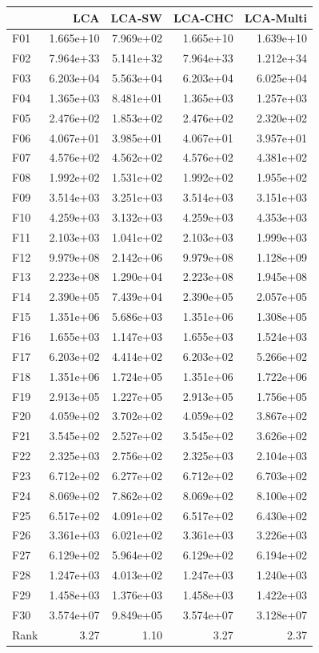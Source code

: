 \begin{tabular}{lrrrr}
\toprule
 & LCA & LCA-SW & LCA-CHC & LCA-Multi \\
\midrule
F01 & 1.665e+10 & 7.969e+02 & 1.665e+10 & 1.639e+10 \\
F02 & 7.964e+33 & 5.141e+32 & 7.964e+33 & 1.212e+34 \\
F03 & 6.203e+04 & 5.563e+04 & 6.203e+04 & 6.025e+04 \\
F04 & 1.365e+03 & 8.481e+01 & 1.365e+03 & 1.257e+03 \\
F05 & 2.476e+02 & 1.853e+02 & 2.476e+02 & 2.320e+02 \\
F06 & 4.067e+01 & 3.985e+01 & 4.067e+01 & 3.957e+01 \\
F07 & 4.576e+02 & 4.562e+02 & 4.576e+02 & 4.381e+02 \\
F08 & 1.992e+02 & 1.531e+02 & 1.992e+02 & 1.955e+02 \\
F09 & 3.514e+03 & 3.251e+03 & 3.514e+03 & 3.151e+03 \\
F10 & 4.259e+03 & 3.132e+03 & 4.259e+03 & 4.353e+03 \\
F11 & 2.103e+03 & 1.041e+02 & 2.103e+03 & 1.999e+03 \\
F12 & 9.979e+08 & 2.142e+06 & 9.979e+08 & 1.128e+09 \\
F13 & 2.223e+08 & 1.290e+04 & 2.223e+08 & 1.945e+08 \\
F14 & 2.390e+05 & 7.439e+04 & 2.390e+05 & 2.057e+05 \\
F15 & 1.351e+06 & 5.686e+03 & 1.351e+06 & 1.308e+05 \\
F16 & 1.655e+03 & 1.147e+03 & 1.655e+03 & 1.524e+03 \\
F17 & 6.203e+02 & 4.414e+02 & 6.203e+02 & 5.266e+02 \\
F18 & 1.351e+06 & 1.724e+05 & 1.351e+06 & 1.722e+06 \\
F19 & 2.913e+05 & 1.227e+05 & 2.913e+05 & 1.756e+05 \\
F20 & 4.059e+02 & 3.702e+02 & 4.059e+02 & 3.867e+02 \\
F21 & 3.545e+02 & 2.527e+02 & 3.545e+02 & 3.626e+02 \\
F22 & 2.325e+03 & 2.756e+02 & 2.325e+03 & 2.104e+03 \\
F23 & 6.712e+02 & 6.277e+02 & 6.712e+02 & 6.703e+02 \\
F24 & 8.069e+02 & 7.862e+02 & 8.069e+02 & 8.100e+02 \\
F25 & 6.517e+02 & 4.091e+02 & 6.517e+02 & 6.430e+02 \\
F26 & 3.361e+03 & 6.021e+02 & 3.361e+03 & 3.226e+03 \\
F27 & 6.129e+02 & 5.964e+02 & 6.129e+02 & 6.194e+02 \\
F28 & 1.247e+03 & 4.013e+02 & 1.247e+03 & 1.240e+03 \\
F29 & 1.458e+03 & 1.376e+03 & 1.458e+03 & 1.422e+03 \\
F30 & 3.574e+07 & 9.849e+05 & 3.574e+07 & 3.128e+07 \\
\midrule
Rank & 3.27 & 1.10 & 3.27 & 2.37 \\
\bottomrule
\end{tabular}
